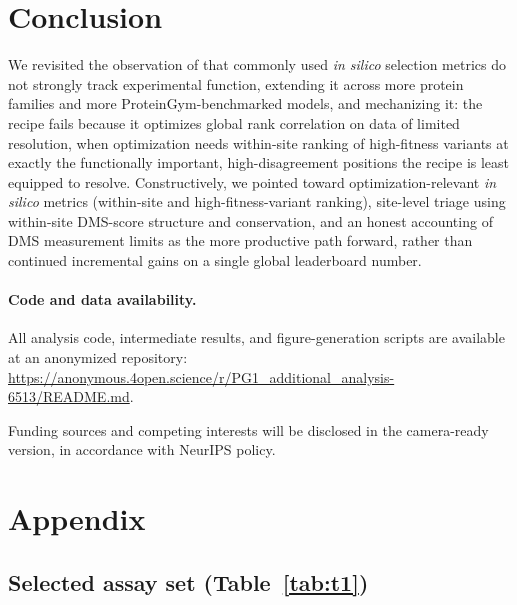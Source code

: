 \documentclass{article}
\begin{document}
\section{Conclusion}
\label{sec:conclusion}

We revisited the observation of \citet{spinner_unified_2026} that commonly used \emph{in silico} selection metrics do not strongly track experimental function, extending it across more protein families and more ProteinGym-benchmarked models, and mechanizing it: the recipe fails because it optimizes global rank correlation on data of limited resolution, when optimization needs within-site ranking of high-fitness variants at exactly the functionally important, high-disagreement positions the recipe is least equipped to resolve. Constructively, we pointed toward optimization-relevant \emph{in silico} metrics (within-site and high-fitness-variant ranking), site-level triage using within-site DMS-score structure and conservation, and an honest accounting of DMS measurement limits as the more productive path forward, rather than continued incremental gains on a single global leaderboard number.

\paragraph{Code and data availability.} All analysis code, intermediate results, and figure-generation scripts are available at an anonymized repository: \url{https://anonymous.4open.science/r/PG1_additional_analysis-6513/README.md}.

\begin{ack}
Funding sources and competing interests will be disclosed in the camera-ready version, in accordance with NeurIPS policy.
\end{ack}




\appendix

\section{Appendix}

\subsection{Selected assay set (Table~\ref{tab:t1})}
\end{document}
